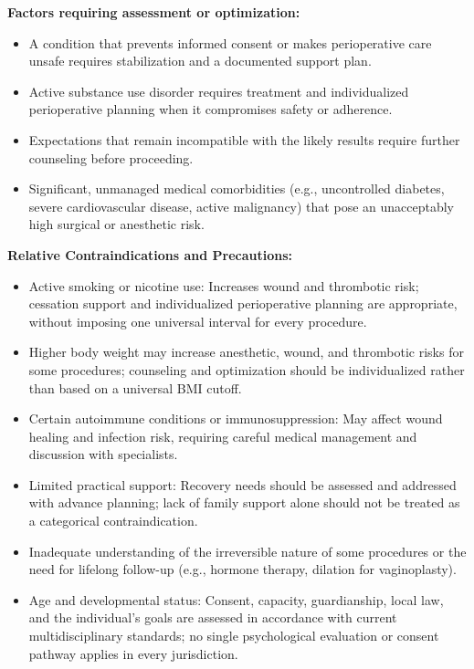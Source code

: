 \textbf{Factors requiring assessment or optimization:}
\begin{itemize}
  \item A condition that prevents informed consent or makes perioperative care unsafe requires stabilization and a documented support plan.
  \item Active substance use disorder requires treatment and individualized perioperative planning when it compromises safety or adherence.
  \item Expectations that remain incompatible with the likely results require further counseling before proceeding.
  \item Significant, unmanaged medical comorbidities (e.g., uncontrolled diabetes, severe cardiovascular disease, active malignancy) that pose an unacceptably high surgical or anesthetic risk.
\end{itemize}

\textbf{Relative Contraindications and Precautions:}
\begin{itemize}
  \item Active smoking or nicotine use: Increases wound and thrombotic risk; cessation support and individualized perioperative planning are appropriate, without imposing one universal interval for every procedure.
  \item Higher body weight may increase anesthetic, wound, and thrombotic risks for some procedures; counseling and optimization should be individualized rather than based on a universal BMI cutoff.
  \item Certain autoimmune conditions or immunosuppression: May affect wound healing and infection risk, requiring careful medical management and discussion with specialists.
  \item Limited practical support: Recovery needs should be assessed and addressed with advance planning; lack of family support alone should not be treated as a categorical contraindication.
  \item Inadequate understanding of the irreversible nature of some procedures or the need for lifelong follow-up (e.g., hormone therapy, dilation for vaginoplasty).
  \item Age and developmental status: Consent, capacity, guardianship, local law, and the individual's goals are assessed in accordance with current multidisciplinary standards; no single psychological evaluation or consent pathway applies in every jurisdiction.
\end{itemize}

